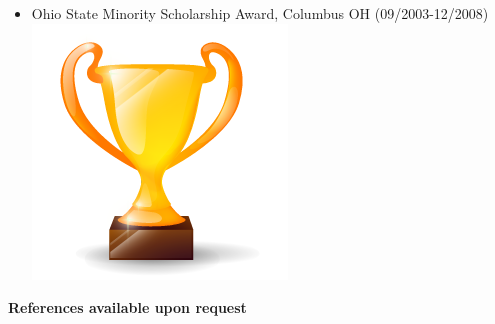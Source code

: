 \documentclass[letterpaper]{twentysecondcv} %
\begin{document}
{{\begin{itemize}
\item	Ohio State Minority Scholarship Award, Columbus OH (09/2003-12/2008)  	\includegraphics[scale=0.05]{img/trophy.png}  


\vspace{2mm}
	
            \end{itemize}}
        }
\vspace{2cm}
\textbf{References available upon request}
\end{document}
